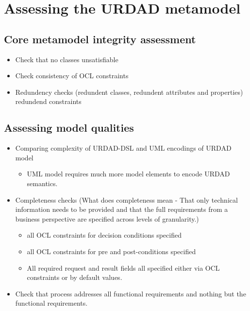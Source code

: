 \section{Assessing the URDAD metamodel \label{sec:metamodelAssessment}}




\subsection{Core metamodel integrity assessment}


\begin{itemize}
  \item Check that no classes unsatisfiable
  \item Check consistency of OCL constraints
  \item Redundency checks (redundent classes, redundent attributes and properties) redundend constraints
\end{itemize}


\subsection{Assessing model qualities}

\begin{itemize}
  \item Comparing complexity of URDAD-DSL and UML encodings of URDAD model
    \begin{itemize}
     \item UML model requires much more model elements to encode URDAD semantics.
    \end{itemize}
  \item Completeness checks
(What does completeness mean - That only technical information needs to be provided and that the full requirements
from a business perspective are specified across levels of granularity.)
    \begin{itemize}
     \item all OCL constraints for decision conditions specified
     \item all OCL constraints for pre and post-conditions specified
     \item All required request and result fields all specified either via OCL constraints 
	or by default values.
    \end{itemize}
  \item Check that process addresses all functional requirements and nothing but the functional requirements.
\end{itemize}

